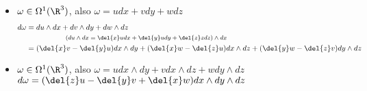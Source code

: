 \begin{exmp}
	\begin{itemize}
		\item $ \omega \in \Omega^1(\R^3) $, also $ \omega = udx + vdy + wdz $
			\begin{align*}
				d\omega &= du \wedge dx + dv \wedge dy + dw \wedge dz\\
				\noalign{\centering\footnotesize $(du \wedge dx = \del{x}u dx + \del{y}u dy + \del{z}z dz) \wedge dx$}
				&= (\del{x}v - \del{y}u) dx \wedge dy + (\del{x}w - \del{z}u) dx \wedge dz + (\del{y}w - \del{z}v) dy \wedge dz
			\end{align*}
		\item $ \omega \in \Omega^1(\R^3) $, also $ \omega = u dx \wedge dy + v dx \wedge dz + w dy \wedge dz $\\
			$ d\omega = (\del{z}u - \del{y}v + \del{x}w) dx \wedge dy \wedge dz $
	\end{itemize}
\end{exmp}

